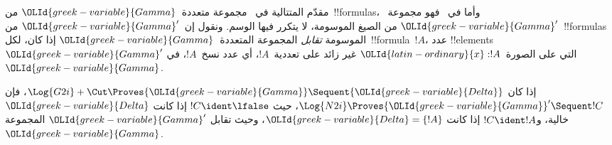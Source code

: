 \documentclass[../../../include/open-logic-section]{subfiles}
\begin{document}


مقدّم المتتالية في~ مجموعة متعددة~${\OLId{greek-variable}{Gamma}}$ من~!!{formula}s،
وأما في~ فهو مجموعة~${\OLId{greek-variable}{Gamma}}'$ من الصيغ الموسومة، لا يتكرر فيها
الوسم. ونقول إن~${\OLId{greek-variable}{Gamma}}'$ من~!!{formula}s الموسومة \emph{تقابل}
المجموعة المتعددة~${\OLId{greek-variable}{Gamma}}$ إذا كان، لكل~!!{formula}~$!A$، عدد
!!{element}s~${\OLId{greek-variable}{Gamma}}'$ التي على الصورة~${\OLId{latin-ordinary}{x}} : !A$ غير زائد على تعددية~$!A$،
أي عدد نسخ~$!A$، في~${\OLId{greek-variable}{Gamma}}$.

\begin{prop}
إذا كان $\Log{G2i} + \Cut \Proves {\OLId{greek-variable}{Gamma}} \Sequent {\OLId{greek-variable}{Delta}}$، فإن $\Log{N2i}
\Proves {\OLId{greek-variable}{Gamma}}' \Sequent !C$، حيث $!C \ident \lfalse$ إذا كانت ${\OLId{greek-variable}{Delta}}$
خالية، و$!C \ident !A$ إذا كانت ${\OLId{greek-variable}{Delta}} = \{!A\}$، وحيث تقابل ${\OLId{greek-variable}{Gamma}}'$
المجموعة~${\OLId{greek-variable}{Gamma}}$.
\end{prop}
\end{document}
